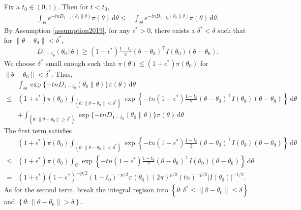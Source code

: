\documentclass[11pt]{article}
\theoremstyle{plain}
\theoremstyle{definition}
\theoremstyle{remark}
\begin{document}
\begin{appendices}
Fix a $t_0 \in (0,1)$.
Then for $t < t_0$,
\begin{align*}
        \int_{\Theta} e^{-tn D_{1-t}(\theta_0 \| \theta)} \pi (\theta) \, \mathrm d \theta
        \leq&
        \int_{\Theta} e^{-tn D_{1-t_0}(\theta_0 \| \theta)} \pi (\theta) \, \mathrm d \theta.
\end{align*}
By Assumption \ref{assumption2019}, for any $\epsilon^* > 0$, there exists a $\delta^* < \delta$ such that for $\|\theta - \theta_0\| < \delta^*$,
\begin{align*}
D_{1-t_0} (\theta_0 || \theta) \geq (1-\epsilon^*) \frac{1-t_0}{2} (\theta -\theta_0)^\top I(\theta_0) (\theta - \theta_0).
\end{align*}
We choose $\delta^*$ small enough such that $\pi(\theta) \leq (1+\epsilon^*) \pi(\theta_0) $ for $\|\theta - \theta_0\| < \delta^*$.
Thus,
\begin{align*}
        &\int_{ \Theta } \exp\{-tn D_{1-t_0}(\theta_0 \| \theta)\} \pi (\theta) \, \mathrm d \theta
        \\
        \leq &
        (1+\epsilon^*) \pi(\theta_0)
        \int_{ \left\{ \theta: \|\theta - \theta_0\| < \delta^* \right\}}
        \exp\left\{ 
            -tn
        (1-\epsilon^*) \frac{1-t_0}{2} (\theta -\theta_0)^\top I(\theta_0) (\theta - \theta_0)
        \right\}
        \, \mathrm d \theta
        \\
        &
        +
        \int_{ \left\{ \theta: \|\theta - \theta_0\| \geq \delta^* \right\}} \exp\{-tn D_{1-t_0}(\theta_0 \| \theta)\} \pi (\theta) \, \mathrm d \theta
\end{align*}
The first term satisfies
\begin{align*}
    &
        (1+\epsilon^*) \pi(\theta_0)
        \int_{ \left\{ \theta: \|\theta - \theta_0\| < \delta^* \right\}}
        \exp\left\{ 
            -tn
        (1-\epsilon^*) \frac{1-t_0}{2} (\theta -\theta_0)^\top I(\theta_0) (\theta - \theta_0)
        \right\}
        \, \mathrm d \theta
        \\
        \leq &
        (1+\epsilon^*) \pi(\theta_0)
        \int_{\Theta}
        \exp\left\{ 
            -tn
        (1-\epsilon^*) \frac{1-t_0}{2} (\theta -\theta_0)^\top I(\theta_0) (\theta - \theta_0)
        \right\}
        \, \mathrm d \theta
        \\
        = &
        (1+\epsilon^*) (1-\epsilon^*)^{-p/2} (1-t_0)^{-p/2} \pi(\theta_0) (2\pi)^{p/2} (tn)^{-p/2} |I(\theta_0)|^{-1/2}
        .
\end{align*}
As for the second term, break the integral regison into $\left\{ \theta: \delta^* \leq \|\theta - \theta_0 \| \leq \delta \right\}$ and $\left\{ \theta: \|\theta- \theta_0\|> \delta \right\}$.

\end{appendices}
\end{document}
